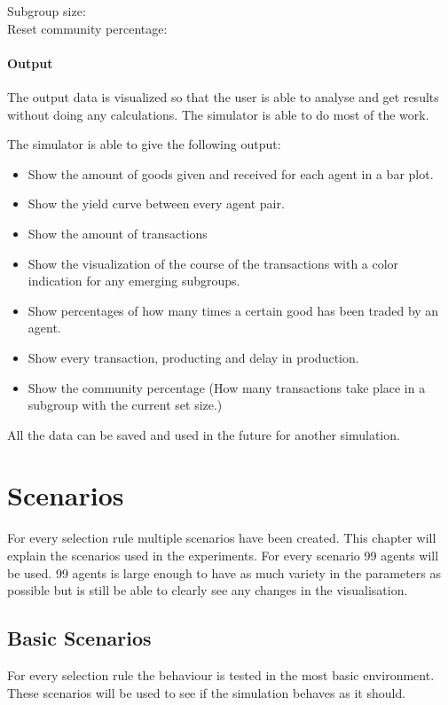 \documentclass[twoside,openright]{uva-bachelor-thesis}
\begin{document}
\begin{description}
  \item[Subgroup size:] 
  \item[Reset community percentage:] 

\end{description}
\subsubsection{Output}
The output data is visualized so that the user is able to analyse and get results without doing any calculations. The simulator is able to do most of the work.

The simulator is able to give the following output:
\begin{itemize}
  \item Show the amount of goods given and received for each agent in a bar plot.
  \item Show the yield curve between every agent pair.
  \item Show the amount of transactions
  \item Show the visualization of the course of the transactions with a color indication for any emerging subgroups.
  \item Show percentages of how many times a certain good has been traded by an agent.
  \item Show every transaction, producting and delay in production.
  \item Show the community percentage (How many transactions take place in a subgroup with the current set size.)
\end{itemize}

All the data can be saved and used in the future for another simulation.


\chapter{Scenarios}
For every selection rule multiple scenarios have been created. This chapter will explain the scenarios used in the experiments. For every scenario 99 agents will be used. 99 agents is large enough to have as much variety in the parameters as possible but is still be able to clearly see any changes in the visualisation.  

\section{Basic Scenarios}
For every selection rule the behaviour is tested in the most basic environment. These scenarios will be used to see if the simulation behaves as it should.
\end{document}
